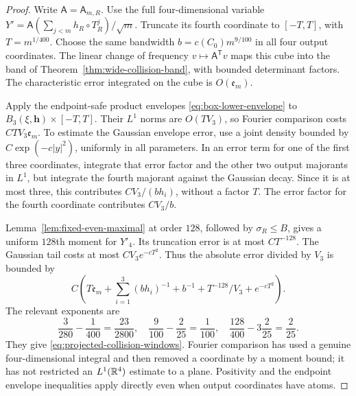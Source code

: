 \begin{proof}
Write $\mathsf A=\mathsf A_{m,R}$. Use the full
four-dimensional variable $Y'=\mathsf A(\sum_{j<m}h_R\circ T_R^j)/\sqrt m$.
Truncate its fourth coordinate to $[-T,T]$, with $T=m^{1/400}$.
Choose the same bandwidth $b=c(C_0)m^{9/100}$ in all four output
coordinates. The linear change of frequency $v\mapsto\mathsf A^{\mathsf T}v$
maps this cube into the band of Theorem~\ref{thm:wide-collision-band},
with bounded determinant factors. The characteristic error integrated
on the cube is $O(\mathfrak e_m)$.

Apply the endpoint-safe product envelopes
\eqref{eq:box-lower-envelope} to
$B_3(\xi,\mathbf h)\times[-T,T]$. Their $L^1$ norms are $O(TV_3)$,
so Fourier comparison costs $CTV_3\mathfrak e_m$. To estimate the
Gaussian envelope error, use a joint density bounded by
$C\exp(-c|y|^2)$, uniformly in all parameters. In an error term for
one of the first three coordinates, integrate that error factor and
the other two output majorants in $L^1$, but integrate the fourth
majorant against the Gaussian decay. Since it is at most three,
this contributes $CV_3/(bh_i)$, without a factor $T$. The error
factor for the fourth coordinate contributes $CV_3/b$.

Lemma~\ref{lem:fixed-even-maximal} at order $128$, followed by
$\sigma_R\le B$, gives a uniform $128$th moment for $Y'_4$.
Its truncation error is at most $CT^{-128}$. The Gaussian tail
costs at most $CV_3e^{-cT^2}$. Thus the absolute error divided by
$V_3$ is bounded by
\begin{equation}\label{eq:stationary-projection-budget}
 C\left(T\mathfrak e_m+\sum_{i=1}^3(bh_i)^{-1}+b^{-1}
                  +T^{-128}/V_3+e^{-cT^2}\right).
\end{equation}
The relevant exponents are
\[
 \frac3{280}-\frac1{400}=\frac{23}{2800},\quad
 \frac9{100}-\frac2{25}=\frac1{100},\quad
 \frac{128}{400}-3\frac2{25}=\frac2{25}.
\]
They give \eqref{eq:projected-collision-windows}. Fourier comparison
has used a genuine four-dimensional integral and then removed a
coordinate by a moment bound; it has not restricted an $L^1(\mathbb R^4)$
estimate to a plane. Positivity and the endpoint envelope inequalities
apply directly even when output coordinates have atoms.
\end{proof}

